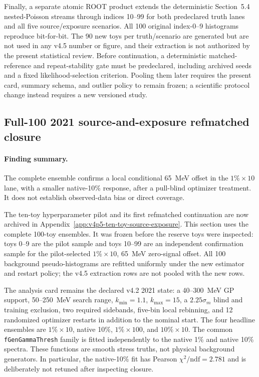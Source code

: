 {Finally, a separate atomic ROOT product extends the deterministic Section~5.4
nested-Poisson streams through indices 10--99 for both predeclared truth lanes and all
five source/exposure scenarios.  All 100 original index-0--9 histograms reproduce
bit-for-bit.  The 90 new toys per truth/scenario are generated but are not used in any
v4.5 number or figure, and their extraction is not authorized by the present
statistical review.  Before continuation, a deterministic matched-reference and
repeat-stability gate must be predeclared, including archived seeds and a fixed
likelihood-selection criterion.  Pooling them later requires the present card,
summary schema, and outlier policy to remain frozen; a scientific protocol change
instead requires a new versioned study.

\FloatBarrier
}

\subsection{Full-100 2021 source-and-exposure refmatched closure}
\label{sec:v4p6-exposure-refmatched-full100}

\paragraph{Finding summary.}
The complete ensemble confirms a local conditional 65~MeV offset in the
$1\%\times10$ lane, with a smaller native-10\% response, after a pull-blind
optimizer treatment.  It does not establish observed-data bias or direct coverage.

The ten-toy hyperparameter pilot and its first refmatched continuation are now
archived in Appendix~\ref{app:v4p5-ten-toy-source-exposure}.  This section uses the
complete 100-toy ensembles.  It was frozen before the reserve toys were inspected:
toys 0--9 are the pilot sample and toys 10--99 are an independent confirmation
sample for the pilot-selected $1\%\times10$, 65~MeV zero-signal offset.  All 100
background pseudo-histograms are refitted uniformly under the new estimator and
restart policy; the v4.5 extraction rows are not pooled with the new rows.

The analysis card remains the declared v4.2 2021 state: a 40--300~MeV GP support,
50--250~MeV search range, $k_{\min}=1.1$, $k_{\max}=15$, a
$2.25\sigma_m$ blind and training exclusion, two required sidebands, five-bin local
rebinning, and 12 randomized optimizer restarts in addition to the nominal start.
The four headline ensembles are $1\%\times10$, native 10\%, $1\%\times100$, and
$10\%\times10$.  The common \texttt{fGenGammaThresh} family is fitted independently
to the native 1\% and native 10\% spectra.  These functions are smooth stress truths,
not physical background generators.  In particular, the native-10\% fit has Pearson
$\chi^2/\mathrm{ndf}=2.781$ and is deliberately not retuned after inspecting closure.

